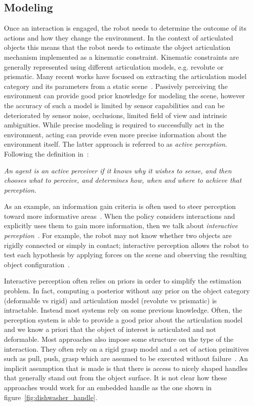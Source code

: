 \subsection{Modeling}
Once an interaction is engaged, the robot needs to determine the outcome of its actions and how they change the environment. In the context of articulated objects this means that the robot needs to estimate the object articulation mechanism implemented as a kinematic constraint. Kinematic constraints are generally represented using different articulation models, e.g. revolute or prismatic. Many recent works have focused on extracting the articulation model category and its parameters from a static scene~\cite{abbatematteo2019learning, li2020category}. 
Passively perceiving the environment can provide good prior knowledge for modeling the scene, however the accuracy of such a model is limited by sensor capabilities and can be deteriorated by sensor noise, occlusions, limited field of view and intrinsic ambiguities. While precise modeling is required to successfully act in the environment, acting can provide even more precise information about the environment itself. The latter approach is referred to as \emph{active perception}. Following the definition in~\cite{bajcsy2018revisiting}:
\begin{displayquote}
\emph{An agent is an active perceiver if it knows why it wishes to sense, and then chooses what to perceive, and determines how, when and where to achieve that perception.}
\end{displayquote}  
As an example, an information gain criteria is often used to steer perception toward more informative areas~\cite{morrison2019multi, hollinger2013sampling}. When the policy considers interactions and explicitly uses them to gain more information, then we talk about \emph{interactive perception}~\cite{bohg2017interactive, katz2014interactive}. For example, the robot may not know whether two objects are rigidly connected or simply in contact; interactive perception allows the robot to test each hypothesis by applying forces on the scene and observing the resulting object configuration~\citep{kroemer2019review}. 

Interactive perception often relies on priors in order to simplify the estimation problem. In fact, computing a posterior without any prior on the object category (deformable vs rigid) and articulation model (revolute vs prismatic) is intractable. Instead most systems rely on some previous knowledge. Often, the perception system is able to provide a good prior about the articulation model~\cite{katz2011interactive} and we know a priori that the object of interest is articulated and not deformable. Most approaches also impose some structure on the type of the interaction. They often rely on a rigid grasp model \cite{karayiannidis2013model} and a set of action primitives such as pull, push, grasp which are assumed to be executed without failure~\cite{hausman2015active}. An implicit assumption that is made is that there is access to nicely shaped handles that generally stand out from the object surface. It is not clear how these approaches would work for an embedded handle as the one shown in figure~\ref{fig:dishwasher_handle}.

